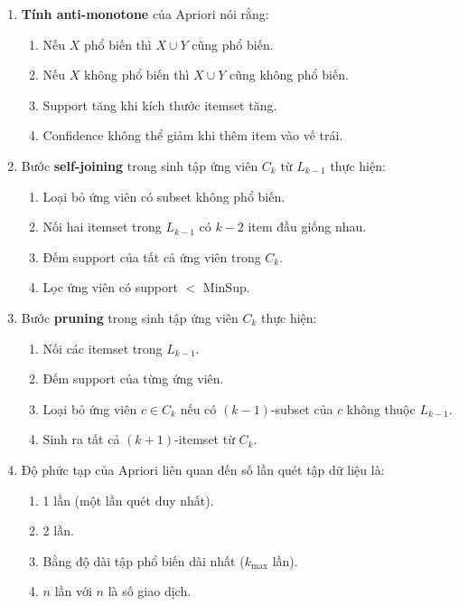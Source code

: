 \documentclass[10pt]{article}
\begin{document}
\begin{enumerate}[leftmargin=*, label=\textbf{Câu \arabic*.}]
    \item \textbf{Tính anti-monotone} của Apriori nói rằng:
    \begin{enumerate}[label=\Alph*.]
        \item Nếu $X$ phổ biến thì $X \cup Y$ cũng phổ biến.
        \item Nếu $X$ không phổ biến thì $X \cup Y$ cũng không phổ biến.
        \item Support tăng khi kích thước itemset tăng.
        \item Confidence không thể giảm khi thêm item vào vế trái.
    \end{enumerate}

    \item Bước \textbf{self-joining} trong sinh tập ứng viên $C_k$ từ $L_{k-1}$ thực hiện:
    \begin{enumerate}[label=\Alph*.]
        \item Loại bỏ ứng viên có subset không phổ biến.
        \item Nối hai itemset trong $L_{k-1}$ có $k-2$ item đầu giống nhau.
        \item Đếm support của tất cả ứng viên trong $C_k$.
        \item Lọc ứng viên có support $<$ MinSup.
    \end{enumerate}

    \item Bước \textbf{pruning} trong sinh tập ứng viên $C_k$ thực hiện:
    \begin{enumerate}[label=\Alph*.]
        \item Nối các itemset trong $L_{k-1}$.
        \item Đếm support của từng ứng viên.
        \item Loại bỏ ứng viên $c \in C_k$ nếu có $(k-1)$-subset của $c$ không thuộc $L_{k-1}$.
        \item Sinh ra tất cả $(k+1)$-itemset từ $C_k$.
    \end{enumerate}

    \item Độ phức tạp của Apriori liên quan đến số lần quét tập dữ liệu là:
    \begin{enumerate}[label=\Alph*.]
        \item 1 lần (một lần quét duy nhất).
        \item 2 lần.
        \item Bằng độ dài tập phổ biến dài nhất ($k_{\max}$ lần).
        \item $n$ lần với $n$ là số giao dịch.
    \end{enumerate}


\end{enumerate}
\end{document}
